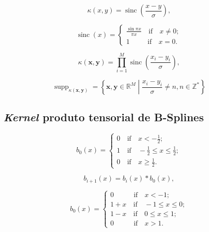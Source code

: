 \begin{equation}
\kappa(x,y) = \operatorname{sinc}\left( \frac{x-y}{\sigma}\right),
\end{equation}

\begin{equation}
    \operatorname{sinc}(x) = \begin{cases}
        \frac{\sin{\pi x}}{\pi x} \quad \text{if} \quad x \neq 0;\\
        1  \quad \;\; \quad \text{if} \quad x = 0.
    \end{cases}
\end{equation}

\begin{equation}
    \kappa(\mathbf{x},\mathbf{y}) = \prod_{i=1}^M \operatorname{sinc}\left( \frac{x_i-y_i}{\sigma} \right),
\end{equation}

\begin{equation}
    \operatorname{supp}_{\kappa(\mathbf{x},\mathbf{y})} = \left\{ \mathbf{x},\mathbf{y}\in \mathbb{R}^M \middle| \frac{x_i- y_i}{\sigma} \neq n, n \in \mathbb{Z}^* \right\}
\end{equation}

\subsection{\textit{Kernel} produto tensorial de B-Splines}

\begin{equation}
    b_0(x) = \begin{cases}
            0 \quad \text{if}  \quad x<-\frac{1}{2};\\
            1 \quad \text{if}  \quad -\frac{1}{2} \leq x \leq \frac{1}{2};\\
            0 \quad \text{if}  \quad x \geq \frac{1}{2}.
    \end{cases}
\end{equation}

\begin{equation}
    b_{i+1}(x) = b_i(x)*b_0(x),
\end{equation}

\begin{equation}
    b_0(x) = \begin{cases}
            0 \quad \quad \;\;\; \text{if}  \quad x<-1;\\
            1+x \quad \text{if}  \quad -1 \leq x \leq 0;\\
            1-x \quad \text{if}  \quad 0 \leq x \leq 1;\\
            0 \quad \quad \;\;\; \text{if}  \quad x > 1.
    \end{cases}
\end{equation}

